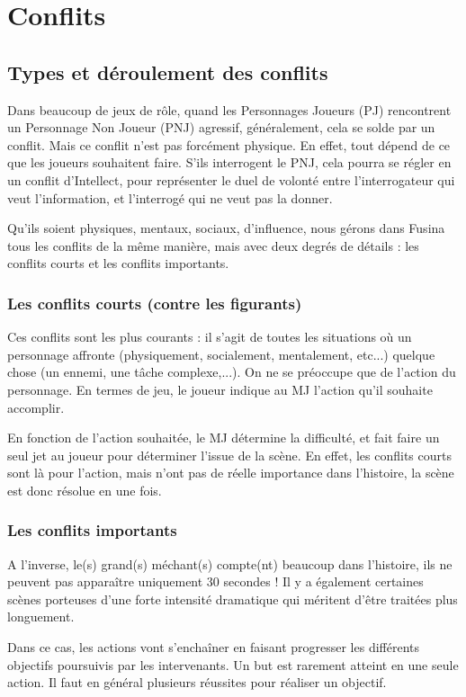 \documentclass{conf/FusinaClass}
\begin{document}
\part{Conflits}
\chapter{Types et déroulement des conflits}
Dans beaucoup de jeux de rôle, quand les Personnages Joueurs (PJ) rencontrent un Personnage Non Joueur (PNJ) agressif, généralement, cela se solde par un conflit. Mais ce conflit n'est pas forcément physique. En effet, tout dépend de ce que les joueurs souhaitent faire. S'ils interrogent le PNJ, cela pourra se régler en un conflit d'Intellect, pour représenter le duel de volonté entre l'interrogateur qui veut l'information, et l'interrogé qui ne veut pas la donner.

Qu'ils soient physiques, mentaux, sociaux, d'influence, nous gérons dans Fusina tous les conflits de la même manière, mais avec deux degrés de détails : les conflits courts et les conflits importants.

\section{Les conflits courts (contre les figurants)}
Ces conflits sont les plus courants : il s'agit de toutes les situations où un personnage affronte (physiquement, socialement, mentalement, etc...) quelque chose (un ennemi, une tâche complexe,...). On ne se préoccupe que de l'action du personnage. En termes de jeu, le joueur indique au MJ l'action qu'il souhaite accomplir.

En fonction de l'action souhaitée, le MJ détermine la difficulté, et fait faire un seul jet au joueur pour déterminer l'issue de la scène. En effet, les conflits courts sont là pour l'action, mais n'ont pas de réelle importance dans l'histoire, la scène est donc résolue en une fois.

\section{Les conflits importants}
A l'inverse, le(s) grand(s) méchant(s) compte(nt) beaucoup dans l'histoire, ils ne peuvent pas apparaître uniquement 30 secondes ! Il y a également certaines scènes porteuses d'une forte intensité dramatique qui méritent d'être traitées plus longuement.

Dans ce cas, les actions vont s’enchaîner en faisant progresser les différents objectifs poursuivis par les intervenants. Un but est rarement atteint en une seule action. Il faut en général plusieurs réussites pour réaliser un objectif. 
\end{document}
